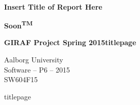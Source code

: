 
\begin{center}

	\vspace*{\fill}

	\hrulefill\newline \\

	\begin{LARGE}	
		\textbf{Insert Title of Report Here}
	\end{LARGE}

	\vspace{0.6cm}

	\begin{Large}
		\textbf{Soon\textsuperscript{TM}}
	\end{Large}

	\vspace{1cm}

	\begin{large} 
		\textbf{GIRAF Project Spring 2015titlepage}
	\end{large}

	\hrulefill\newline

	Aalborg University		\\
	Software -- P6 -- 2015	\\
	SW604F15				\\
    
	\vspace*{\fill}

\end{center}titlepage
\thispagestyle{empty}